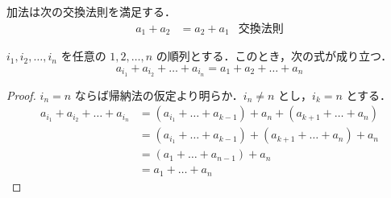 \documentclass[leqno,autodetect-engine, dvipdfmx-if-dvi,ja=standard]{bxjsarticle}
\begin{document}
	\begin{dfn} 加法は次の交換法則を満足する．
		\begin{align}
			a_1 + a_2 &= a_2 + a_1 & \text{交換法則}
		\end{align}
	\end{dfn}

	\begin{thm}[一般交換法則] $i_1,i_2, \dots, i_n$ を任意の $1,2,\dots,n$ の順列とする．このとき，次の式が成り立つ．
		\begin{equation}
			a_{i_1} + a_{i_2} + \dots + a_{i_n} = a_1 + a_2 + \dots + a_n
		\end{equation}
	\end{thm}
	\begin{proof} $i_n=n$ ならば帰納法の仮定より明らか．$i_n \not= n$ とし，$i_k =n$ とする．
		\begin{align}
			a_{i_1} + a_{i_2} + \dots + a_{i_n} &= (a_{i_1} + \dots + a_{k-1}) + a_n + (a_{k+1} + \dots + a_n) \\
			&= (a_{i_1} + \dots + a_{k-1}) + (a_{k+1} + \dots + a_n) + a_n \\
			&= (a_1 + \dots + a_{n-1}) + a_n \\
			&= a_1 + \dots + a_n
		\end{align}
	\end{proof}
\end{document}

